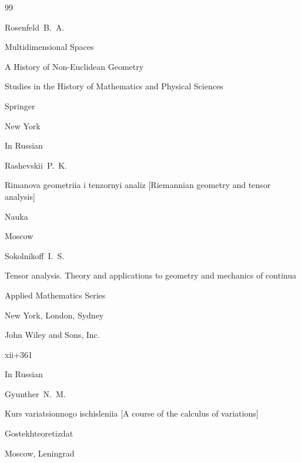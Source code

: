 \begin{thebibliography}{99}

\by Rosenfeld~B.~A. 


\paper Multidimensional Spaces

\inbook A History of Non-Euclidean Geometry

\serial Studies in the History of Mathematics and Physical Sciences


\publ Springer

\publaddr New York







\lang In Russian

\by Rashevskii~P.~K.

\book Rimanova geometriia i tenzornyi analiz \rm [Riemannian geometry and tensor analysis]


\publ Nauka

\publaddr Moscow








\by Sokolnikoff~I.~S.

\book Tensor analysis. Theory and applications to geometry and mechanics of continua


\serial Applied Mathematics Series

\publaddr New York, London, Sydney

\publ John Wiley and Sons, Inc.

\totalpages xii+361 





\lang In Russian

\by Gyunther~N.~M.

\book   Kurs variatsionnogo ischisleniia \rm [A course of the calculus of variations]


\publ  Gostekhteoretizdat

\publaddr Moscow, Leningrad


\end{thebibliography}
